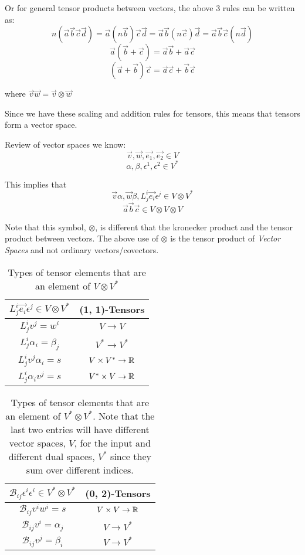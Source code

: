 \documentclass{report}
\begin{document}
Or for general tensor products between vectors, the above 3 rules can be written as:
$$ n\left( \vec{a}\vec{b}\vec{c} \vec{d}\right)= \vec{a}\left( n \vec{b} \right) \vec{c}\vec{d} = \vec{a} \vec{b} \left( n \vec{c} \right)\vec{d} = \vec{a}\vec{b}\vec{c} \left( n \vec{d} \right) $$ 
$$ \vec{a}\left( \vec{b} + \vec{c} \right) = \vec{a} \vec{b}+ \vec{a} \vec{c}$$
$$ \left(\vec{a} + \vec{b}\right) \vec{c} = \vec{a} \vec{c}+ \vec{b} \vec{c}$$

where $\vec{v}\vec{w} = \vec{v}\otimes \vec{w}$
 
Since we have these scaling and addition rules for tensors, this means that tensors form a vector space.

Review of vector spaces we know:
$$ \vec{v}, \vec{w}, \vec{e_1}, \vec{e_2} \in V $$ 
$$ \alpha, \beta, \epsilon^1, \epsilon^2 \in V^* $$ 

This implies that
$$ \vec{v}\alpha, \vec{w}\beta, L_j^i \vec{e_i} \epsilon^j \in V \otimes V^* $$ 
$$\vec{a}\vec{b} \vec{c} \in V \otimes V \otimes V$$ 

Note that this symbol, $\otimes$, is different that the kronecker product and the tensor product between vectors. The above use of $\otimes$ is the tensor product of \emph{Vector Spaces} and not ordinary vectors/covectors.

\begin{table}[htpb]
	\centering
	\caption{Types of tensor elements that are an element of $V \otimes V^*$}
	\label{tab:vtpv*}
	\begin{tabular}{|cc|}
		\hline
		$L_j^i \vec{e_i} \epsilon^j \in V \otimes V^*$ & (1, 1)-Tensors \\ 
		\hline
		$L_j^i v^j = w^i$ & $V \to V$ \\
		$L_j^i \alpha_i = \beta_j$ & $V^* \to V^*$ \\
		$L_j^i v^j \alpha_i = s$ & $V \times V^* \to \R$ \\
		$L_j^i \alpha_i v^j  = s$ & $V^* \times V \to \R$ \\
		\hline
	\end{tabular}
\end{table}

\begin{table}[htpb]
	\centering
	\caption{Types of tensor elements that are an element of $V^* \otimes V^*$. Note that the last two entries will have different vector spaces, $V$, for the input and different dual spaces, $V^*$ since they sum over different indices.}
	\label{tab:v*tpv*}
	\begin{tabular}{|cc|}
		\hline
		$\mathcal{B}_{ij}\epsilon^i \epsilon^i \in V^* \otimes V^*$ & (0, 2)-Tensors \\ 
		\hline
		$\mathcal{B}_{ij}v^i w^i = s$ & $V \times  V \to \R$ \\
		$\mathcal{B}_{ij}v^i = \alpha_j$ & $V  \to V^*$ \\
		$\mathcal{B}_{ij}v^j = \beta_i$ & $V  \to V^*$ \\
		\hline
	\end{tabular}
\end{table}
\end{document}
